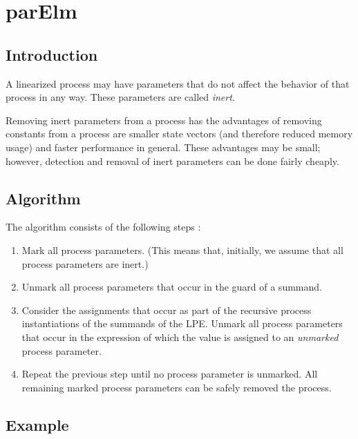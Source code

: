 \chapter{parElm}

\section{Introduction}

A linearized process may have parameters that do not affect the behavior of that process in any way.
These parameters are called \emph{inert}.

Removing inert parameters from a process has the advantages of removing constants from a process are smaller state vectors (and therefore reduced memory usage) and faster performance in general.
These advantages may be small; however, detection and removal of inert parameters can be done fairly cheaply.

\section{Algorithm}

The algorithm consists of the following steps \cite{groote2001computer}:

\begin{enumerate}

\item Mark all process parameters.
(This means that, initially, we assume that all process parameters are inert.)

\item Unmark all process parameters that occur in the guard of a summand.

\item Consider the assignments that occur as part of the recursive process instantiations of the summands of the LPE.
Unmark all process parameters that occur in the expression of which the value is assigned to an \emph{unmarked} process parameter.

\item Repeat the previous step until no process parameter is unmarked.
All remaining marked process parameters can be safely removed the process.

\end{enumerate}

\clearpage
\section{Example}

